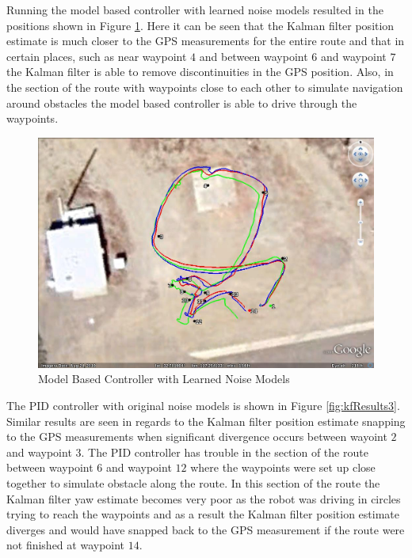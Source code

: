 Running the model based controller with learned noise models resulted in the positions shown in Figure \ref{fig:kfResults2}. Here it can be seen that the Kalman filter position estimate is much closer to the GPS measurements for the entire route and that in certain places, such as near waypoint $4$ and between waypoint $6$ and waypoint $7$ the Kalman filter is able to remove discontinuities in the GPS position. Also, in the section of the route with waypoints close to each other to simulate navigation around obstacles the model based controller is able to drive through the waypoints.

\begin{figure}[ht!]
	\centering
	\includegraphics[width=.75\textwidth]{images/GE/20101203_1545_kf_lyapNewQR}
	\caption{Model Based Controller with Learned Noise Models}
	\label{fig:kfResults2}
\end{figure}

The PID controller with original noise models is shown in Figure \ref{fig:kfResults3}. Similar results are seen in regards to the Kalman filter position estimate snapping to the GPS measurements when significant divergence occurs between wayoint $2$ and waypoint $3$. The PID controller has trouble in the section of the route between waypoint $6$ and waypoint $12$ where the waypoints were set up close together to simulate obstacle along the route. In this section of the route the Kalman filter yaw estimate becomes very poor as the robot was driving in circles trying to reach the waypoints and as a result the Kalman filter position estimate diverges and would have snapped back to the GPS measurement if the route were not finished at waypoint $14$.

